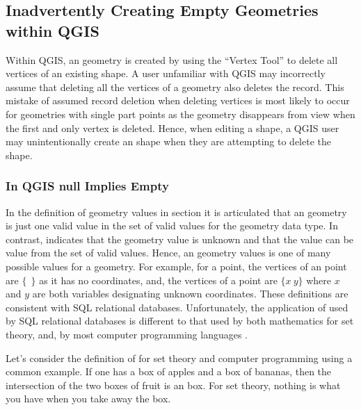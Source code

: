 \documentclass[a4paper,11pt,english]{sphinxmanual}
\begin{document}
\subsection{Inadvertently Creating Empty Geometries within QGIS}
\label{\detokenize{QGISproblems:inadvertently-creating-empty-geometries-within-qgis}}
Within QGIS, an  geometry is created by using the “Vertex Tool” to delete all vertices of an existing shape.  A user unfamiliar with QGIS may incorrectly assume that deleting all the vertices of a geometry also deletes the record.  This mistake of assumed record deletion when deleting vertices is most likely to occur for geometries with single part points as the geometry disappears from view when the first and only vertex is deleted.  Hence, when editing a shape, a QGIS user may unintentionally create an  shape when they are attempting to delete the shape.


\subsubsection{In QGIS null Implies Empty}
\label{\detokenize{QGISproblems:in-qgis-null-implies-empty}}
In the definition of  geometry values in section {\hyperref[\detokenize{background:emptyanchor}]{}} it is articulated that an  geometry is just one valid value in the set of valid values for the geometry data type.  In contrast,  indicates that the geometry value is unknown and that the value can be  value from the set of valid values. Hence, an  geometry values is one of many possible values for a  geometry.  For example, for a point, the vertices of an  point are \(\{\ \ \}\) as it has no coordinates, and, the vertices of a  point are \(\{x\ y\}\) where \(x\) and \(y\) are both variables designating unknown coordinates. These definitions are consistent with SQL relational databases.  Unfortunately, the application of  used by SQL relational databases is different to that used by both mathematics for set theory, and, by most computer programming languages .

Let’s consider the definition of  for set theory and computer programming using a common example.  If one has a box of apples and a box of bananas, then the intersection of the two boxes of fruit is an  box. For set theory,  \textendash{} nothing is what you have when you take away the box.
\end{document}
